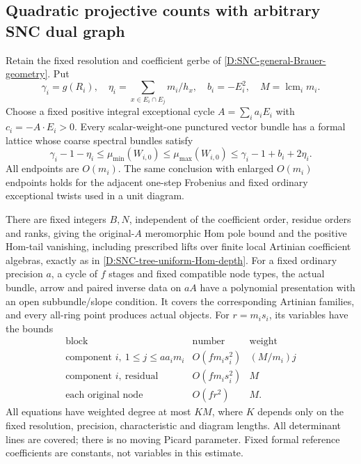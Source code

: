 \subsection{Quadratic projective counts with arbitrary SNC dual graph}

\begin{proposition}
\label{D:SNC-general-weighted-presentation}
Retain the fixed resolution and coefficient gerbe of
\ref{D:SNC-general-Brauer-geometry}. Put
\[
 \gamma_i=g(R_i),\quad
 \eta_i=\sum_{x\in E_i\cap E_j}m_i/h_x,\quad
 b_i=-E_i^2,\quad M=\operatorname{lcm}_i m_i.
\]
Choose a fixed positive integral exceptional cycle
\(A=\sum_i a_iE_i\) with \(c_i=-A\cdot E_i>0\).
Every scalar-weight-one punctured vector bundle has a
formal lattice whose coarse spectral bundles satisfy
\[
 \gamma_i-1-\eta_i\leq\mu_{\min}(W_{i,0})
 \leq\mu_{\max}(W_{i,0})
 \leq\gamma_i-1+b_i+2\eta_i.                            \tag{D.GP.1}
\]
All endpoints are \(O(m_i)\). The same conclusion with
enlarged \(O(m_i)\) endpoints holds for the adjacent
one-step Frobenius and fixed ordinary exceptional twists
used in a unit diagram.

There are fixed integers \(B,N\), independent of the
coefficient order, residue orders and ranks, giving
the original-\(A\) meromorphic Hom pole bound and the
positive Hom-tail vanishing, including prescribed lifts
over finite local Artinian coefficient algebras, exactly
as in \ref{D:SNC-tree-uniform-Hom-depth}.
For a fixed ordinary precision \(a\), a cycle of \(f\)
stages and fixed compatible node types, the actual
bundle, arrow and paired inverse data on \(aA\) have a
polynomial presentation with an open subbundle/slope
condition. It covers the corresponding Artinian
families, and every all-ring point produces actual
objects. For \(r=m_i s_i\), its variables have the bounds
\[
 \begin{array}{c|c|c}
 \text{block}&\text{number}&\text{weight}\\ \hline
 \text{component }i,\ 1\leq j\leq aa_i m_i
       &O(fm_i s_i^2)&(M/m_i)j\\
 \text{component }i,\ \text{residual}
       &O(fm_i s_i^2)&M\\
 \text{each original node}&O(fr^2)&M .
 \end{array}                                           \tag{D.GP.2}
\]
All equations have weighted degree at most \(KM\),
where \(K\) depends only on the fixed resolution,
precision, characteristic and diagram lengths.
All determinant lines are covered; there is no moving
Picard parameter. Fixed formal reference coefficients
are constants, not variables in this estimate.
\end{proposition}

